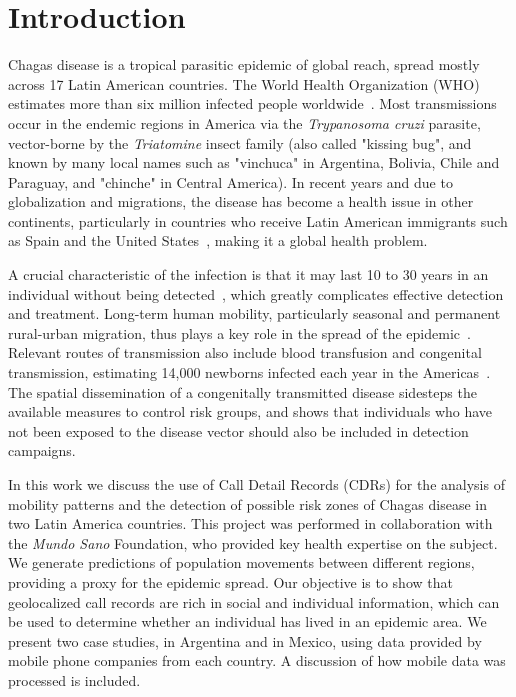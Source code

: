 \section{Introduction}

Chagas disease is a tropical parasitic epidemic of global reach, spread mostly across 17 Latin American countries. The World Health Organization (WHO) estimates more than six million infected people worldwide~\cite{who2016}. Most transmissions occur in the endemic regions in America via the \textit{Trypanosoma cruzi} parasite, vector-borne by the \textit{Triatomine} insect family (also called "kissing bug", and known by many local names such as "vinchuca" in Argentina, Bolivia, Chile and Paraguay, and "chinche" in Central America). In recent years and due to globalization and migrations, the disease has become a health issue in other continents, particularly in countries who receive Latin American immigrants such as Spain and the United States~\cite{schmunis2010chagas}, making it a global health problem.

A crucial characteristic of the infection is that it may last 10 to 30 years in an individual without being detected~\cite{rassi2012american}, which greatly complicates effective detection and treatment. Long-term human mobility, particularly seasonal and permanent rural-urban migration, thus plays a key role in the spread of the epidemic~\cite{briceno2009chagas}. Relevant routes of transmission also include blood transfusion and congenital transmission, estimating 14,000 newborns infected each year in the Americas~\cite{OPS2006chagas}.
The spatial dissemination of a congenitally transmitted disease sidesteps the available measures to control risk groups, and shows that individuals who have not been exposed to the disease vector should also be included in detection campaigns.

In this work we discuss the use of Call Detail Records (CDRs) for the analysis of mobility patterns and the detection of possible risk zones of Chagas disease in two Latin America countries. This project was performed in collaboration with the \textit{Mundo Sano} Foundation, who provided key health expertise on the subject. We generate predictions of population movements between different regions, providing a proxy for the epidemic spread. Our objective is to show that geolocalized call records are rich in social and individual information, which can be used to determine whether an individual has lived in an epidemic area. We present two case studies, in Argentina and in Mexico, using data provided by mobile phone companies from each country. A discussion of how mobile data was processed is included. 


